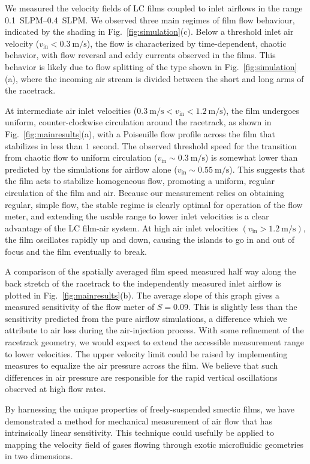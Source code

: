 \documentclass[aagreenthesis]{subfiles}
\begin{document}
We measured the velocity
fields of LC films coupled to inlet airflows in the range
\SIrange[range-phrase=--]{0.1}{.4}{SLPM}. We observed three main regimes of film flow
behaviour, indicated by the shading in Fig.~\ref{fig:simulation}(c). Below a threshold inlet
air velocity ($v_\text{in} <
\SI[per-mode=symbol]{0.3}{\metre\per\second}$), the flow is characterized
by time-dependent, chaotic behavior, with flow reversal and eddy currents observed in the films.
This behavior is likely due to flow splitting of the type shown in Fig.~\ref{fig:simulation}(a), where the incoming air stream is divided
between the short and long arms of the racetrack.

At intermediate air inlet velocities
($\SI[per-mode=symbol]{0.3}{\metre\per\second}<v_\text{in} <
\SI[per-mode=symbol]{1.2}{\metre\per\second}$), the film undergoes uniform, counter-clockwise circulation around the racetrack,
as shown in Fig.~\ref{fig:mainresults}(a),
with a Poiseuille flow profile across the film that stabilizes in less than $1$
second.
The observed threshold speed for the transition from chaotic flow to uniform circulation
($v_\text{in} \sim \SI{0.3}{\metre\per\second}$) is somewhat lower than predicted by the simulations
for airflow alone ($v_\text{in} \sim \SI{0.55}{\metre\per\second}$).
This
suggests that the film acts to stabilize homogeneous flow,
promoting a uniform, regular circulation of the film and air. Because our
measurement relies on obtaining regular, simple flow, the stable regime is clearly optimal
for operation of the flow meter, and extending the usable range to lower inlet
velocities is a clear advantage of the LC film-air system. At high air inlet velocities
$(v_\text{in} > \SI[per-mode=symbol]{1.2}{\metre\per\second})$, the film
oscillates rapidly up and down, causing the islands to go in and out of focus and
the film eventually to break.


A comparison of the spatially averaged film speed measured half way along the
back stretch of the racetrack to the independently measured inlet airflow is plotted in
Fig.~\ref{fig:mainresults}(b). The average slope of this graph gives a measured
sensitivity of the flow meter of $S= 0.09$.
This is slightly less than the sensitivity predicted from the pure airflow
simulations, a difference which we attribute to air loss during the air-injection process.
With some refinement of the racetrack geometry, we would expect to extend the accessible measurement range to lower velocities.
The upper velocity limit could be raised by implementing measures to
equalize the air pressure across the film. We believe that such differences in air pressure
are responsible for the rapid vertical oscillations observed at high flow rates.


By harnessing the unique properties of freely-suspended smectic films, we have demonstrated a method for mechanical
measurement of air flow that has intrinsically linear sensitivity. This technique could usefully be applied to mapping
the velocity field of gases flowing through exotic microfluidic geometries in two dimensions.
\end{document}
